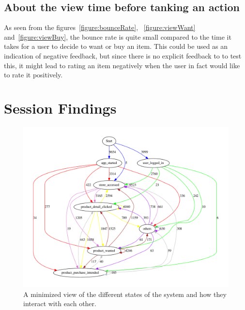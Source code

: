 \subsection{About the view time before tanking an action}
    As seen from the figures~\ref{figure:bounceRate}, ~\ref{figure:viewWant} and~\ref{figure:viewBuy}, the bounce rate is quite small compared to the time it takes for a user to decide to want or buy an item.
    This could be used as an indication of negative feedback, but since there is no explicit feedback to to test this, it might lead to rating an item negatively when the user in fact would like to rate it positively.



\section{Session Findings}

    \begin{figure}[H]
        \includegraphics[width=5in]{image/statesInteractionTrue-gvfile.pdf}
        \centering
        \caption[Minimized states in session and how they interact]{A minimized view of the different states of the system and how they interact with each other.}
        \label{figure:minStatesInteractions}
    \end{figure}

